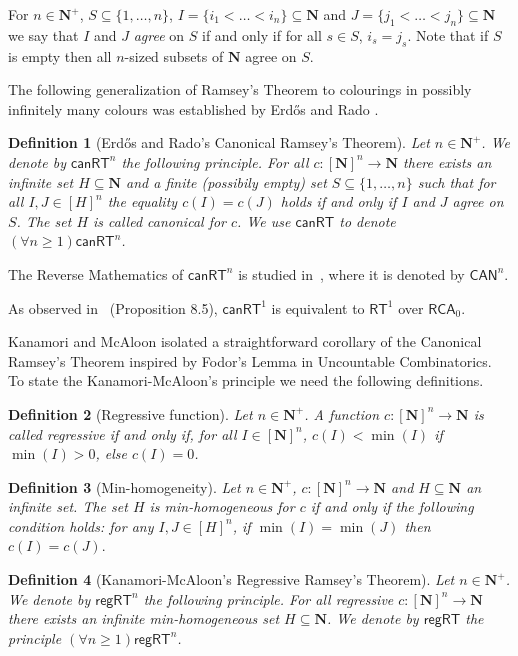 \documentclass[a4paper,11pt]{article}
\newtheorem{definition}{Definition}
\newcommand\Nat{\mathbf{N}}
\newcommand\RCA{\mathsf{RCA}}
\newcommand\RT{\mathsf{RT}}
\newcommand\REG{\mathsf{regRT}}
\newcommand\CAN{\mathsf{canRT}}
\begin{document}
For $n\in\Nat^+$, $S \subseteq \{1, \dots, n\}$, $I = \{i_1 < \dots < i_n\}\subseteq\Nat$ and $J = \{ j_1 < \dots < j_n\}\subseteq\Nat$ we say 
that $I$ and $J$ {\em agree} on $S$ if and only if for all $s \in S$, $i_s = j_s$. Note that if $S$ is empty then all
$n$-sized subsets of $\Nat$ agree on $S$.

The following generalization of Ramsey's Theorem to colourings in possibly infinitely many colours was established by Erd\H{o}s and Rado \cite{Erd-Rad:50}. 

\begin{definition}[Erd\H{o}s and Rado's Canonical Ramsey's Theorem]\label{defi:can}
Let $n\in\Nat^+$. We denote by $\CAN^n$ the following principle. For all $c: [\Nat]^n \to \Nat$ there exists an infinite set $H\subseteq \Nat$ and a finite (possibily empty) set $S \subseteq \{1, \dots, n\}$ such that for all $I,J \in [H]^n$ the equality $c(I) = c(J)$ holds if and only if $I$ and $J$ agree on $S$.
The set $H$ is called {\em canonical} for $c$. We use $\CAN$ to denote $(\forall n \geq 1)\CAN^n$.
\end{definition}

The Reverse Mathematics of $\CAN^n$ is studied in~\cite{Mil:08}, where it is denoted by $\mathsf{CAN}^n$. 
																		
As observed in~\cite{Mil:08} (Proposition 8.5), $\CAN^1$ is equivalent to $\RT^1$ over $\RCA_0$.

Kanamori and McAloon \cite{Kan-McA:87} isolated a straightforward corollary of the Canonical Ramsey's Theorem 
inspired by Fodor's Lemma in Uncountable Combinatorics. To state the Kanamori-McAloon's principle we need the following definitions.

\begin{definition}[Regressive function]
Let $n\in\Nat^+$. 
A function $c:[\Nat]^n\to\Nat$ is called regressive if and only if, for all $I \in [\Nat]^n$, $c(I) < \min(I)$ if
$\min(I)>0$, else $c(I)=0$. 
\end{definition}

\begin{definition}[Min-homogeneity]\label{defi:minhomo}
Let $n\in\Nat^+$, $c:[\Nat]^n\to \Nat$ and $H\subseteq \Nat$ an infinite set. 
The set $H$ is min-homogeneous for $c$ if and only if the following condition holds:
for any $I, J \in [H]^n$, if $\min(I)=\min(J)$ then $c(I)  = c(J).$
\end{definition}

\begin{definition}[Kanamori-McAloon's Regressive Ramsey's Theorem]
Let $n\in\Nat^+$. We denote by $\REG^n$ the following principle. For all regressive $c:[\Nat]^n \to \Nat$ 
there exists an infinite min-homogeneous set
$H\subseteq\Nat$. We denote by $\REG$ the principle $(\forall n \geq 1) \REG^n$.
\end{definition}
\end{document}

